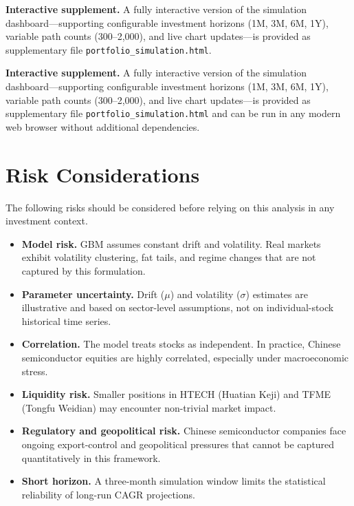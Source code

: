 \documentclass[11pt,a4paper]{article}
\begin{document}
\medskip
\noindent\textbf{Interactive supplement.} A fully interactive version
of the simulation dashboard---supporting configurable investment
horizons (1M, 3M, 6M, 1Y), variable path counts (300--2,000), and live
chart updates---is provided as supplementary file
\texttt{portfolio\_simulation.html}.

\medskip
\noindent\textbf{Interactive supplement.} A fully interactive version
of the simulation dashboard---supporting configurable investment
horizons (1M, 3M, 6M, 1Y), variable path counts (300--2,000), and
live chart updates---is provided as supplementary file
\texttt{portfolio\_simulation.html} and can be run in any modern
web browser without additional dependencies.

\section{Risk Considerations}
\label{sec:risk}

The following risks should be considered before relying on this analysis
in any investment context.

\begin{itemize}
  \item \textbf{Model risk.} GBM assumes constant drift and volatility.
        Real markets exhibit volatility clustering, fat tails, and regime
        changes that are not captured by this formulation.
  \item \textbf{Parameter uncertainty.} Drift ($\mu$) and volatility
        ($\sigma$) estimates are illustrative and based on sector-level
        assumptions, not on individual-stock historical time series.
  \item \textbf{Correlation.} The model treats stocks as independent.
        In practice, Chinese semiconductor equities are highly
        correlated, especially under macroeconomic stress.
  \item \textbf{Liquidity risk.} Smaller positions in HTECH (Huatian Keji)
        and TFME (Tongfu Weidian) may encounter non-trivial market impact.
  \item \textbf{Regulatory and geopolitical risk.} Chinese semiconductor
        companies face ongoing export-control and geopolitical pressures
        that cannot be captured quantitatively in this framework.
  \item \textbf{Short horizon.} A three-month simulation window limits
        the statistical reliability of long-run CAGR projections.
\end{itemize}
\end{document}
